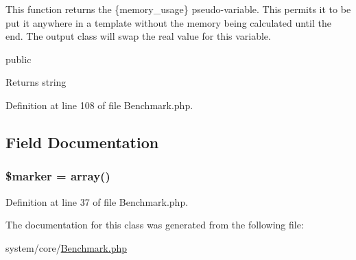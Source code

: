 This function returns the \{memory\-\_\-usage\} pseudo-\/variable. This permits it to be put it anywhere in a template without the memory being calculated until the end. The output class will swap the real value for this variable.

public \begin{DoxyReturn}{Returns}
string 
\end{DoxyReturn}


Definition at line 108 of file Benchmark.\-php.



\subsection{Field Documentation}
\hypertarget{class_c_i___benchmark_aad34fbf53cda6bd8a3a9c46764d534fa}{
\subsubsection[{\$marker}]{\setlength{\rightskip}{0pt plus 5cm}\$marker = array()}}\label{class_c_i___benchmark_aad34fbf53cda6bd8a3a9c46764d534fa}


Definition at line 37 of file Benchmark.\-php.



The documentation for this class was generated from the following file\-:\begin{DoxyCompactItemize}
\item 
system/core/\hyperlink{_benchmark_8php}{Benchmark.\-php}\end{DoxyCompactItemize}
